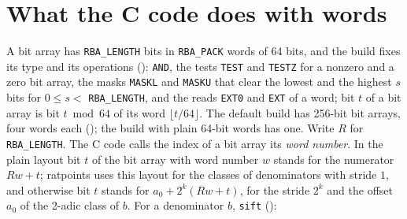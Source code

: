 \section{What the C code does with words}\label{sec:wordsC}

A bit array has \verb|RBA_LENGTH| bits in \verb|RBA_PACK| words of 64 bits, and the build fixes
its type and its operations (): \verb|AND|, the tests
\verb|TEST| and \verb|TESTZ| for a nonzero and a zero bit array, the masks \verb|MASKL| and
\verb|MASKU| that clear the lowest and the highest $s$ bits for $0 \le s <$ \verb|RBA_LENGTH|, and
the reads \verb|EXT0| and \verb|EXT| of a word; bit $t$ of a bit array is bit $t \bmod 64$ of its
word $\lfloor t/64 \rfloor$. The default build has 256-bit bit arrays, four words each
(); the build with plain 64-bit words has one. Write $R$ for
\verb|RBA_LENGTH|. The C code calls the index of a bit array its \emph{word number}. In the plain
layout bit $t$ of the bit array with word number $w$ stands for the numerator $R w + t$; ratpoints
uses this layout for the classes of denominators with stride $1$, and otherwise bit $t$ stands for
$a_0 + 2^k(R w + t)$, for the stride $2^k$ and the offset $a_0$ of the 2-adic class of $b$. For a
denominator $b$, \verb|sift| ():
